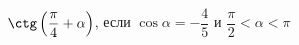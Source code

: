 \begin{ex}[type=simplify_calculate]
	\begin{condition}
		\( \ctg\left( \dfrac{\pi}{4}+\alpha \right) \), \quad если \( \cos\alpha=-\dfrac{4}{5} \) и \( \dfrac{\pi}{2}<\alpha<\pi \)
	\end{condition}
\end{ex}